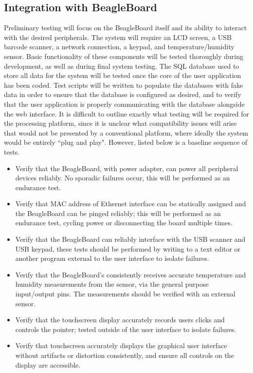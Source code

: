 \documentclass[11pt]{article} %
\begin{document}
\subsection{Integration with BeagleBoard}
Preliminary testing will focus on the BeagleBoard itself and its ability to interact with the desired peripherals.  The system will require an LCD screen, a USB barcode scanner, a network connection, a keypad, and temperature/humidity sensor.  Basic functionality of these components will be tested thoroughly during development, as well as during final system testing. 
\newline \quad \newline
The SQL database used to store all data for the system will be tested once the core of the user application has been coded.  Test scripts will be written to populate the databases with fake data in order to ensure that the database is configured as desired, and to verify that the user application is properly communicating with the database alongside the web interface.
\newline \quad \newline
It is difficult to outline exactly what testing will be required for the processing platform, since it is unclear what compatibility issues will arise that would not be presented by a conventional platform, where ideally the system would be entirely ``plug and play". However, listed below is a baseline sequence of tests.
\begin{itemize}
\item Verify that the BeagleBoard, with power adapter, can power all peripheral devices reliably. No sporadic failures occur, this will be performed as an endurance test.
\item Verify that MAC address of Ethernet interface can be statically assigned and the BeagleBoard can be pinged reliably; this will be performed as an endurance test, cycling power or disconnecting the board multiple times.
\item Verify that the BeagleBoard can reliably interface with the USB scanner and USB keypad, these tests should be performed by writing to a text editor or another program external to the user interface to isolate failures.
\item Verify that the BeagleBoard's consistently receives accurate temperature and humidity measurements from the sensor, via the general purpose input/output pins. The measurements should be verified with an external sensor.
\item Verify that the touchscreen display accurately records users clicks and controls the pointer; tested outside of the user interface to isolate failures.
\item Verify that touchscreen accurately displays the graphical user interface without artifacts or distortion consistently, and ensure all controls on the display are accessible.
\end{itemize}
\end{document}
